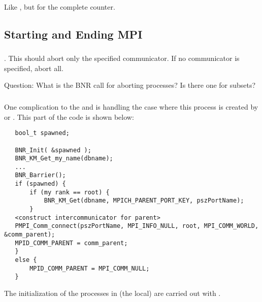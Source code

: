\documentclass{article}
\begin{document}
Like , but for the complete counter.



\subsection{Starting and Ending MPI}
\label{sec:init}

\subsubsection{}
\begin{adi3}
.  This should abort only the specified communicator.  If
no communicator is specified, abort all.  

Question: What is the BNR call for aborting processes?  Is there one for
subsets?  
\end{adi3}

\subsubsection{}

One complication to the  and  is
handling the case where this process is created by  or
.  This part of the code is shown below:
\begin{verbatim}
   bool_t spawned;

   BNR_Init( &spawned );
   BNR_KM_Get_my_name(dbname);
   ...
   BNR_Barrier();
   if (spawned) {
       if (my rank == root) {
	       BNR_KM_Get(dbname, MPICH_PARENT_PORT_KEY, pszPortName);
       }
   <construct intercommunicator for parent>
   PMPI_Comm_connect(pszPortName, MPI_INFO_NULL, root, MPI_COMM_WORLD, &comm_parent);
   MPID_COMM_PARENT = comm_parent;
   }
   else {
       MPID_COMM_PARENT = MPI_COMM_NULL;
   }
\end{verbatim}

The initialization of the processes in (the local) 
are carried out with .
\end{document}
